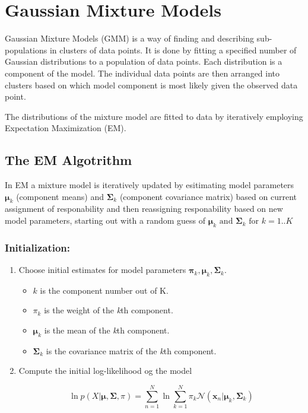 \section*{Gaussian Mixture Models}
Gaussian Mixture Models (GMM) is a way of finding and describing sub-populations in clusters of data points.
It is done by fitting a specified number of Gaussian distributions to a population of data points.
Each distribution is a component of the model. 
The individual data points are then arranged into clusters based on which model component is most likely given the observed data point.

The distributions of the mixture model are fitted to data by iteratively employing Expectation Maximization (EM).

\subsection*{The EM Algotrithm}
In EM a mixture model is iteratively updated by esitimating model parameters $\bm{\mu}_k $ (component means) and $ \bm{\Sigma}_k $ (component covariance matrix) based on current assignment of responability and then reassigning responability based on new model parameters, starting out with a random guess of $\bm{\mu}_k \text{ and } \bm{\Sigma}_k \text{ for } k=1..K$ 


\subsubsection*{Initialization:}
\begin{enumerate}
\item
Choose initial estimates for model parameters $ \mathbf{\pi}_{k}, \mathbf{\mu}_{k}, \mathbf{\Sigma}_{k} $.

\begin{itemize}

	\item
	$ k $ is the component number out of K.

	\item
	$ \pi_{k} $  is the weight of the \textit{k}th component.

	\item
	$ \mathbf{\mu}_{k}$ is the mean of the \textit{k}th component.

	\item
	$ \mathbf{\Sigma}_{k} $ is the covariance matrix of the \textit{k}th component.

	\end{itemize}


\item
Compute the initial log-likelihood og the model

\begin{equation} \label{eq:loglikeGMM}
\ln p\left(X | \mathbf{\mu}, \mathbf{\Sigma}, \pi\right) = 
\sum_{n=1}^{N} \ln \sum_{k=1}^{N} \pi_{k}\mathcal{N}(\mathbf{x}_{n}|\mathbf{\mu}_{k},\mathbf{\Sigma}_{k})
\end{equation}

\end{enumerate}


